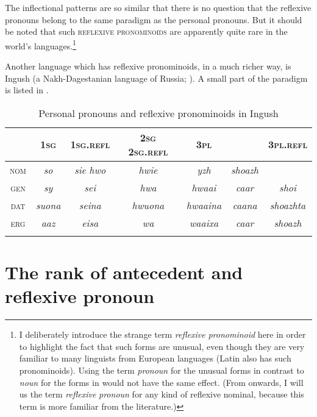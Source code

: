 \documentclass[output=paper]{langscibook}
\begin{document}
The inflectional patterns are so similar that there is no question that the reflexive pronouns belong to the same paradigm as the personal pronouns. But it should be noted that such \textsc{reflexive} \textsc{pronominoids} are apparently quite rare in the world’s languages.\footnote{ {I deliberately introduce the strange term} {\textit{reflexive} \textit{pronominoid}} {here in order to highlight the fact that such forms are unusual, even though they are very familiar to many linguists from European languages (Latin also has such pronominoids). Using the term} {\textit{pronoun}} {for the unusual forms in contrast to} {\textit{noun}} {for the forms in  would not have the same effect. (From  onwards, I will us the term} {\textit{reflexive} \textit{pronoun}} {for any kind of reflexive nominal, because this term is more familiar from the literature.)}}

  Another language which has reflexive pronominoids, in a much richer way, is Ingush (a Nakh-Dagestanian language of Russia; \citealt[\S9.1]{Nichols2011}). A small part of the paradigm is listed in .


\begin{table}
    \centering
    \begin{tabular}{ccccccc}
     \lsptoprule
      & \textsc{1sg} & \textsc{1sg.refl} & \textsc{2sg}  \textsc{2sg.refl} & \textsc{3pl} & &\textsc{3pl.refl}\\
\hline 
\textsc{nom} &   \textit{so}  &\textit{sie}  \textit{hwo} & \textit{hwie} & \textit{yzh} & \textit{shoazh}  \\
\textsc{gen}   &   \textit{sy} & \textit{sei} & \textit{hwa}&  \textit{hwaai} & \textit{caar} & \textit{shoi}\\
\textsc{dat} &     \textit{suona}&  \textit{seina} & \textit{hwuona} & \textit{hwaaina}  &\textit{caana} & \textit{shoazhta}\\
\textsc{erg}    &  \textit{aaz}&  \textit{eisa} & \textit{wa} & \textit{waaixa}&  \textit{caar} & \textit{shoazh}\\
  \lspbottomrule
    \end{tabular}
     \caption{Personal pronouns and reflexive pronominoids in Ingush}\label{tab:Haspelmath:3}
\end{table}

       


\section{The rank of antecedent and reflexive pronoun}\label{sec:Haspelmath:7}
\end{document}
